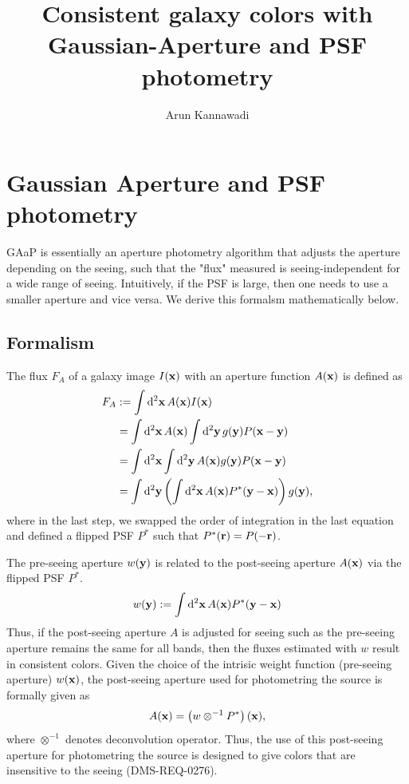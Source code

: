\documentclass[DM,lsstdraft, authoryear,toc]{lsstdoc}
\title{Consistent galaxy colors with \\ Gaussian-Aperture and PSF photometry}
\author{%
Arun Kannawadi
}
\date{\vcsDate}
\newcommand{\rmd}{\mathrm{d}^2}
\begin{document}
\maketitle


\section{Gaussian Aperture and PSF photometry}

GAaP is essentially an aperture photometry algorithm that adjusts the aperture depending on the seeing, such that the "flux" measured is seeing-independent for a wide range of seeing.
Intuitively, if the PSF is large, then one needs to use a smaller aperture and vice versa.
We derive this formalsm mathematically below.

\subsection{Formalism}
The flux $F_A$ of a galaxy image $I({\bf x})$ with an aperture function $A({\bf x})$ is defined as
\begin{align}
  F_A &:= \int\rmd{\bf x}\, A({\bf x}) I({\bf x}) \\
      &= \int\rmd{\bf x}\, A({\bf x}) \int\rmd{\bf y}\,g({\bf y}) P({\bf x}-{\bf y}) \\
      &= \int\rmd{\bf x}\int\rmd{\bf y}\, A({\bf x}) g({\bf y}) P({\bf x}-{\bf y}) \\
      &= \int\rmd{\bf y} \left(\int{\rmd}{\bf x}\, A({\bf x})P^*({\bf y}-{\bf x}) \right) g({\bf y}),
\end{align}
where in the last step, we swapped the order of integration in the last equation and defined a flipped PSF $P^*$ such that $P^*({\bf r}) = P(-{\bf r})$.

The pre-seeing aperture $w({\bf y})$ is related to the post-seeing aperture $A({\bf x})$ via the
flipped PSF $P^*$.
\begin{equation}
  w({\bf y}) := \int{\rmd}{\bf x}\, A({\bf x})P^*({\bf y}-{\bf x})
\end{equation}
Thus, if the post-seeing aperture $A$ is adjusted for seeing such as the pre-seeing aperture remains the same for all bands,
then the fluxes estimated with $w$ result in consistent colors. Given the choice of the intrisic weight function (pre-seeing aperture) $w({\bf x})$, the post-seeing aperture used for photometring the source is formally given as
\begin{equation}
  A({\bf x}) = \left(w \otimes^{-1} P^*\right)({\bf x}),
\end{equation}
where $\otimes^{-1}$ denotes deconvolution operator.
Thus, the use of this post-seeing aperture for photometring the source is designed to give colors that are insensitive to the seeing (DMS-REQ-0276).
\end{document}
